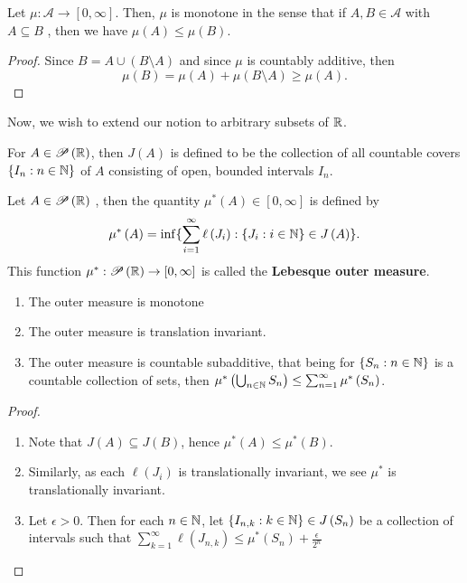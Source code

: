 \begin{proposition}
	Let \(\mu: \mathscr{A} \to \left[ 0, \infty \right]  \). Then, \( \mu\) is monotone in the sense that if \(A, B \in \mathscr{A}\) with \(A \subseteq B\) , then we have \( \mu\left( A \right)  \le \mu\left( B \right) \).
\end{proposition}
\begin{proof}
	Since \(B = A \cup \left( B \setminus A \right) \)	 and since \( \mu\) is countably additive, then \[
		\mu\left( B \right)  = \mu\left( A \right)  + \mu\left( B \setminus A \right) \ge \mu\left( A \right)
	.\]
\end{proof}
Now, we wish to extend our notion to arbitrary subsets of \(\mathbb{R}\).
\begin{Notation}
	For \(A \in \mathscr{P}\left( \mathbb{R} \right) \), then \(J\left( A \right) \) is defined to be the collection of all countable covers \(\{I_{n} : n \in \mathbb{N}\} \) of \(A\) consisting of open, bounded intervals \(I_{n}\).
\end{Notation}
\begin{definition}
	Let \(A \in \mathscr{P}\left( \mathbb{R} \right) \)	, then the quantity \( \mu^{*} \left( A \right)  \in \left[ 0, \infty \right] \) is defined by \[
		\mu^{*}\left( A \right) = \inf \{\sum_{i= 1}^{\infty} \ell\left( J_{i} \right) : \{J_{i} : i \in \mathbb{N}\} \in J\left( A \right)  \}
	.\]
	This function \( \mu^{*}: \mathscr{P}\left( \mathbb{R} \right)  \to \left[ 0, \infty \right] \) is called the \textbf{Lebesque outer measure}.
\end{definition}
\begin{lemma}
	\begin{enumerate}
		\item The outer measure is monotone
		\item The outer measure is translation invariant.
		\item The outer measure is countable subadditive, that being for \(\{S_{n} : n \in \mathbb{N}\} \) is a countable collection of sets, then \( \mu^{*}\left( \bigcup_{n \in \mathbb{N}} S_{n} \right) \le \sum_{n= 1}^{\infty} \mu^{*}\left( S_{n} \right) \).  \end{enumerate}
\end{lemma}

\begin{proof}
	\begin{enumerate}
		\item Note that \(J\left( A \right) \subseteq J\left( B \right) \), hence \( \mu^{*} \left( A \right)  \le \mu^{*} \left( B \right) \).
		\item Similarly, as each \(\ell\left( J_{i} \right) \) is translationally invariant, we see \( \mu^{*}\) is translationally invariant.
		\item Let \(\epsilon >0\). Then for  each \(n \in \mathbb{N}\), let \(\{I_{n, k} : k \in \mathbb{N}\} \in J\left( S_{n} \right) \) be a collection of intervals such that \(\sum_{k=1}^{\infty} \ell\left( J_{n, k} \right)  \le \mu^{*}\left( S_{n} \right) + \frac{\epsilon}{2^{n}} \)
	\end{enumerate}
\end{proof}
